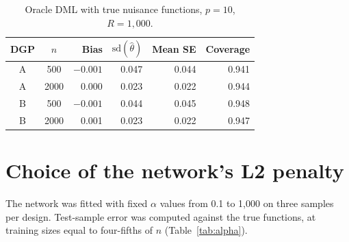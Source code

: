 \documentclass[11pt,a4paper]{article}
\begin{document}
\begin{table}[h]
\centering\small
\caption{Oracle DML with true nuisance functions, $p=10$, $R=1{,}000$.}\label{tab:oracle}
\begin{tabular}{ccrrrr}
\toprule
DGP & $n$ & Bias & $\mathrm{sd}(\hat\theta)$ & Mean SE & Coverage\\
\midrule
A & 500 & $-0.001$ & 0.047 & 0.044 & 0.941\\
A & 2000 & 0.000 & 0.023 & 0.022 & 0.944\\
B & 500 & $-0.001$ & 0.044 & 0.045 & 0.948\\
B & 2000 & 0.001 & 0.023 & 0.022 & 0.947\\
\bottomrule
\end{tabular}
\end{table}

\section{Choice of the network's L2 penalty}\label{app:alpha}

The network was fitted with fixed $\alpha$ values from 0.1 to 1,000 on three samples per design. Test-sample error was computed against the true functions, at training sizes equal to four-fifths of $n$ (Table~\ref{tab:alpha}).
\end{document}

